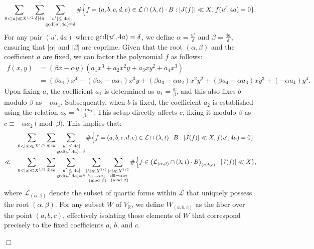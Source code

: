 \documentclass{article}
\newenvironment{proof}{\noindent {\bf Proof:}}{$\Box$ \vspace{2 ex}}
\def \gcd{{\rm gcd}}
\begin{document}
\begin{proof}
\begin{equation}\label{}
\sum_{0<|a|\ll X^{1/2}} \sum_{\delta \mid 4a}\sum_{\substack{ |u'| \leq |4a|\\
\gcd(u',4a)=\delta }}
 \#\Big\{f=(a,b,c,d,e) \in \mathcal{L}\cap (\lambda,t)\cdot B : |J(f)|\ll X ,\, f(u',4a)=0 \}.
\end{equation}
For any pair $(u', 4a)$ where $\gcd(u', 4a) = \delta$, we define $\alpha = \frac{u'}{\delta}$ and $\beta = \frac{4a}{\delta}$, ensuring that $|\alpha|$ and $|\beta|$ are coprime. Given that the root $(\alpha, \beta)$ and the coefficient $a$ are fixed, we can factor the polynomial $f$ as follows:
\begin{equation}\label{factoring by root}
    \begin{split}
         f(x, y) &= (\beta x-\alpha y)(a_1x^3+a_2x^2y+a_3xy^2+a_4x^3)\\&= (\beta a_1) x^4 + (\beta a_2 - \alpha a_1) x^3 y + (\beta a_3 - \alpha a_2) x^2 y^2 + (\beta a_4 - \alpha a_3) x y^3 + (-\alpha a_4) y^4.
    \end{split}
\end{equation}
Upon fixing $a$, the coefficient $a_1$ is determined as $a_1 = \frac{a}{\beta}$, and this also fixes $b$ modulo $\beta$ as $ -\alpha a_1$. Subsequently, when $b$ is fixed, the coefficient $a_2$ is established using the relation $a_2 = \frac{b + \alpha a_1}{\beta}$. This setup directly affects $c$, fixing it modulo $\beta$ as $c \equiv -\alpha a_2 \pmod \beta$. This implies that:
\begin{align*}
& \sum_{0 < |a| \ll X^{1/2}} \sum_{\delta \mid 4a} \sum_{\substack{|u'| \leq |4a| \\ \gcd(u', 4a) = \delta}} \# \Big\{ f = (a, b, c, d, e) \in \mathcal{L} \cap (\lambda,t)\cdot B: |J(f)| \ll X, f(u', 4a) = 0 \}\\ \ll \quad
& \sum_{0 < |a| \ll X^{1/2}} \sum_{\delta \mid 4a} \sum_{\substack{|u'| \leq |4a| \\ \gcd(u', 4a) = \delta}} \sum_{\substack{|b| \ll X^{1/2} \\ b \equiv -\alpha a_1 \\ \pmod{\beta}}} \sum_{\substack{|c| \ll X^{1/2} \\ c \equiv -\alpha a_2 \\ \pmod{\beta}}} \# \Big\{ f \in \big(\mathcal{L}_{(\alpha,\beta)} \cap (\lambda,t)\cdot B\big)_{(a, b, c)} :  |J(f)| \ll X\},
\end{align*}
where $\mathcal{L}_{(\alpha, \beta)}$ denote the subset of quartic forms within $\mathcal{L}$ that uniquely possess the root $(\alpha, \beta)$. For any subset $W$ of $V_{\mathbb{R}}$, we define $W_{(a, b, c)}$ as the fiber over the point $(a, b, c)$, effectively isolating those elements of $W$ that correspond precisely to the fixed coefficients $a$, $b$, and $c$. 


\end{proof}
\end{document}
